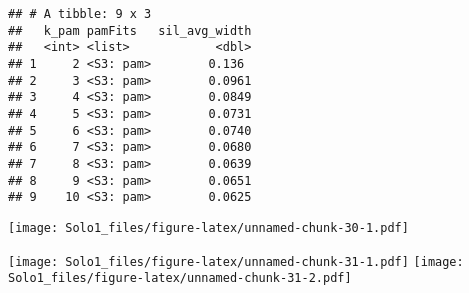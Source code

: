 \documentclass[]{article}
\newenvironment{Shaded}{\begin{snugshade}}{\end{snugshade}}
\newcommand{\KeywordTok}[1]{\textcolor[rgb]{0.13,0.29,0.53}{\textbf{#1}}}
\newcommand{\DataTypeTok}[1]{\textcolor[rgb]{0.13,0.29,0.53}{#1}}
\newcommand{\DecValTok}[1]{\textcolor[rgb]{0.00,0.00,0.81}{#1}}
\newcommand{\StringTok}[1]{\textcolor[rgb]{0.31,0.60,0.02}{#1}}
\newcommand{\OperatorTok}[1]{\textcolor[rgb]{0.81,0.36,0.00}{\textbf{#1}}}
\newcommand{\NormalTok}[1]{#1}
\begin{document}
\begin{verbatim}
## # A tibble: 9 x 3
##   k_pam pamFits   sil_avg_width
##   <int> <list>            <dbl>
## 1     2 <S3: pam>        0.136 
## 2     3 <S3: pam>        0.0961
## 3     4 <S3: pam>        0.0849
## 4     5 <S3: pam>        0.0731
## 5     6 <S3: pam>        0.0740
## 6     7 <S3: pam>        0.0680
## 7     8 <S3: pam>        0.0639
## 8     9 <S3: pam>        0.0651
## 9    10 <S3: pam>        0.0625
\end{verbatim}

\begin{Shaded}
\end{Shaded}

\texttt{[image: Solo1\_files/figure-latex/unnamed-chunk-30-1.pdf]}

\begin{Shaded}
\end{Shaded}

\texttt{[image: Solo1\_files/figure-latex/unnamed-chunk-31-1.pdf]}
\texttt{[image: Solo1\_files/figure-latex/unnamed-chunk-31-2.pdf]}

\begin{Shaded}
\end{Shaded}
\end{document}
